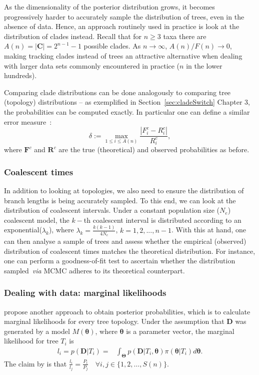 As the dimensionality of the posterior distribution grows, it becomes progressively harder to accurately sample the distribution of trees, even in the absence of data.
Hence, an approach routinely used in practice is look at the distribution of clades instead.
Recall that for $n \geq 3$ taxa there are $ A(n) = |\boldsymbol C| = 2^{n-1} -1$ possible clades. 
As $n \rightarrow \infty$, $A(n)/F(n) \rightarrow 0$, making tracking clades instead of trees an attractive alternative when dealing with larger data sets commonly encountered in practice ($n$ in the lower hundreds).

Comparing clade distributions can be done analogously to comparing tree (topology) distributions  -- as exemplified in Section~\ref{sec:cladeSwitch} Chapter 3, the probabilities can be computed exactly.
In particular one can define a similar error measure~\citep{Hoehna2008}:
\[ \delta := \max_{1 \leq i \leq A(n)} \frac{|F^c_i - R^c_i|}{R^c_i}, \]
where $\boldsymbol F^c$ and $\boldsymbol R^c$ are the true (theoretical) and observed probabilities as before.

\subsubsection{Coalescent times}

In addition to looking at topologies, we also need to ensure the distribution of branch lengths is being accurately sampled.
To this end, we can look at the distribution of coalescent intervals.
Under a constant population size ($N_e$) coalescent model, the $k-$th coalescent interval is distributed according to an exponential($\lambda_k$), where $\lambda_k = \frac{k(k-1)}{4N_e}$, $k = 1, 2, ..., n-1$.
With this at hand, one can then analyse a sample of trees and assess whether the empirical (observed) distribution of coalescent times matches the theoretical distribution.
For instance, one can perform a goodness-of-fit test to ascertain whether the distribution sampled~\textit{via} MCMC adheres to its theoretical counterpart.

\subsubsection{Dealing with data: marginal likelihoods}

\cite{Hoehna2008} propose another approach to obtain posterior probabilities, which is to calculate marginal likelihoods for every tree topology.
Under the assumption that $\boldsymbol D$ was generated by a model $M(\boldsymbol \theta)$, where $\boldsymbol \theta$ is a parameter vector, the marginal likelihood for tree $T_i$ is
\begin{align}
 \label{eq:margLike}
 l_i = p(\boldsymbol D | T_i) = & \int_{\boldsymbol \Theta} p(\boldsymbol D | T_i, \boldsymbol \theta) \pi(\boldsymbol \theta | T_i)d\boldsymbol \theta. 
\end{align}
The claim by \cite{Hoehna2008} is that $\frac{l_i}{l_j} = \frac{P_i}{P_j} \quad \forall i, j \in \{1, 2, \ldots, S(n)\}$.


